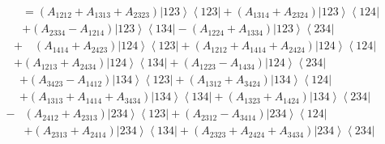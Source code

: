 \documentclass[aps,preprint]{revtex4}%
\begin{document}
\begin{align}
\quad &  =\left(  A_{1212}+A_{1313}+A_{2323}\right)  \left\vert
123\right\rangle \left\langle 123\right\vert +\left(  A_{1314}+A_{2324}%
\right)  \left\vert 123\right\rangle \left\langle 124\right\vert \nonumber\\
&  +\left(  A_{2334}-A_{1214}\right)  \left\vert 123\right\rangle \left\langle
134\right\vert -\left(  A_{1224}+A_{1334}\right)  \left\vert 123\right\rangle
\left\langle 234\right\vert
\end{align}%
\begin{align}
&  +\quad\left(  A_{1414}+A_{2423}\right)  \left\vert 124\right\rangle
\left\langle 123\right\vert +\left(  A_{1212}+A_{1414}+A_{2424}\right)
\left\vert 124\right\rangle \left\langle 124\right\vert \nonumber\\
&  +\left(  A_{1213}+A_{2434}\right)  \left\vert 124\right\rangle \left\langle
134\right\vert +\left(  A_{1223}-A_{1434}\right)  \left\vert 124\right\rangle
\left\langle 234\right\vert
\end{align}%
\begin{align}
&  +\left(  A_{3423}-A_{1412}\right)  \left\vert 134\right\rangle \left\langle
123\right\vert +\left(  A_{1312}+A_{3424}\right)  \left\vert 134\right\rangle
\left\langle 124\right\vert \nonumber\\
&  +\left(  A_{1313}+A_{1414}+A_{3434}\right)  \left\vert 134\right\rangle
\left\langle 134\right\vert +\left(  A_{1323}+A_{1424}\right)  \left\vert
134\right\rangle \left\langle 234\right\vert
\end{align}%
\begin{align}
-  &  \left(  A_{2412}+A_{2313}\right)  \left\vert 234\right\rangle
\left\langle 123\right\vert +\left(  A_{2312}-A_{3414}\right)  \left\vert
234\right\rangle \left\langle 124\right\vert \nonumber\\
&  +\left(  A_{2313}+A_{2414}\right)  \left\vert 234\right\rangle \left\langle
134\right\vert +\left(  A_{2323}+A_{2424}+A_{3434}\right)  \left\vert
234\right\rangle \left\langle 234\right\vert
\end{align}
\end{document}
